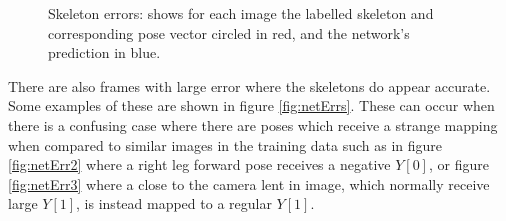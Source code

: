 \documentclass[11pt]{article} %
\begin{document}
\begin{figure}
\centering
{}
\qquad%
%
\caption{Skeleton errors: shows for each image the labelled skeleton and corresponding pose vector circled in red, and the network's prediction in blue. }
\label{fig:skelErrs}
\end{figure}


There are also frames with large error where the skeletons do appear accurate. Some examples of these are shown in figure \ref{fig:netErrs}. These can occur when there is a confusing case where there are poses which receive a strange mapping when compared to similar images in the training data such as in figure \ref{fig:netErr2} where a right leg forward pose receives a negative $Y[0]$, or figure \ref{fig:netErr3} where a close to the camera lent in image, which normally receive large $Y[1]$, is instead mapped to a regular $Y[1]$. 
\end{document}
